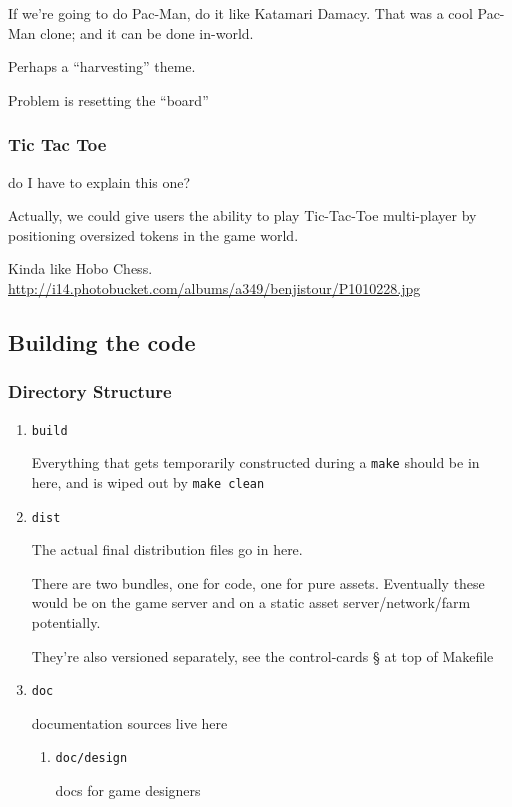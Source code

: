 \documentclass[11pt]{article}
\begin{document}
\begin{enumerate}
If we're going to do Pac-Man, do it like Katamari Damacy. That was a
cool Pac-Man clone; and it can be done in-world.

Perhaps a “harvesting” theme.

Problem is resetting the “board”
\subsubsection{Tic Tac Toe}
\label{sec-5-3-2}

do I have to explain this one?

Actually, we could give users the ability to play Tic-Tac-Toe
multi-player by positioning oversized tokens in the game world.

Kinda like Hobo Chess.
\url{http://i14.photobucket.com/albums/a349/benjistour/P1010228.jpg}

\subsection{Building the code}
\label{sec-5-4}

\subsubsection{Directory Structure}
\label{sec-5-4-1}

\begin{enumerate}
\item \texttt{build}
\label{sec-5-4-1-1}

Everything that gets temporarily constructed during a \texttt{make} should
be in here, and is wiped out by \texttt{make clean}
\item \texttt{dist}
\label{sec-5-4-1-2}

The actual final distribution files go in here.

There are two bundles, one for code, one for pure assets. Eventually
these would be on the game server and on a static asset
server/network/farm potentially.

They're also versioned separately, see the control-cards § at top of
Makefile
\item \texttt{doc}
\label{sec-5-4-1-3}

documentation sources live here

\begin{enumerate}
\item \texttt{doc/design}
\label{sec-5-4-1-3-1}

docs for game designers


\end{enumerate}
\end{enumerate}
\end{enumerate}
\end{document}
